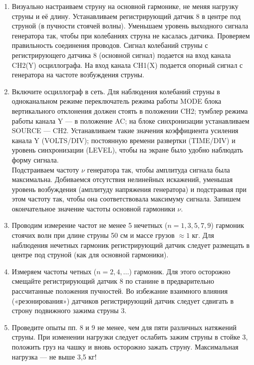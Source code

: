 \documentclass[a4paper, 12pt]{article}%
\begin{document}
\begin{enumerate}
\item Визуально настраиваем струну на основной гармонике, не меняя нагрузку струны и её длину. Устанавливаем регистрирующий датчик 8 в центре под струной (в пучности стоячей волны). Уменьшаем уровень выходного сигнала генератора так, чтобы при колебаниях струна не касалась датчика. Проверяем правильность соединения проводов. Сигнал колебаний струны с регистрирующего датчика 8 (основной сигнал) подается на вход канала CH2(Y) осциллографа. На вход канала CH1(X) подается опорный сигнал с генератора на частоте возбуждения струны.
\item Включите осциллограф в сеть. Для наблюдения колебаний струны в одноканальном режиме переключатель режима работы MODE блока вертикального отклонения должен стоять в положении CH2; тумблер режима работы канала Y — в положение AC; на блоке синхронизации устанавливаем SOURCE — CH2. Устанавливаем такие значения коэффициента усиления канала Y (VOLTS/DIV); постоянную времени развертки (TIME/DIV) и уровень синхронизации (LEVEL), чтобы на экране было удобно наблюдать форму сигнала.\\
Подстраиваем частоту $\nu$ генератора так, чтобы амплитуда сигнала была максимальна. Добиваемся отсутствия нелинейных искажений, уменьшая уровень возбуждения (амплитуду напряжения генератора) и подстраивая при этом частоту так, чтобы она соответствовала максимуму сигнала. Запишем окончательное значение частоты основной гармоники $\nu$.
\item Проводим измерение частот не менее 5 нечетных ($n = 1, 3, 5, 7, 9$) гармоник стоячих волн при длине струны 50 см и массе грузов $ \approx 1$ кг. Для наблюдения нечетных гармоник регистрирующий датчик следует размещать в центре под струной (как для основной гармоники).
\item Измеряем частоты четных ($n = 2, 4, ...$) гармоник. Для этого осторожно смещайте регистрирующий датчик 8 по станине в предварительно рассчитанные положения пучностей. Во избежание взаимного влияния («резонирования») датчиков регистрирующий датчик следует сдвигать в строну подвижного зажима струны 3.
\item Проведите опыты пп. 8 и 9 не менее, чем для пяти различных натяжений струны. При изменении нагрузки следует ослабить зажим струны в стойке 3, положить груз на чашку и вновь осторожно зажать струну. Максимальная нагрузка — не выше 3,5 кг!
\begin{center}
\begin{tabular}{|c|c|c|ccc}

\end{tabular}
\end{center}
\end{enumerate}
\end{document}
